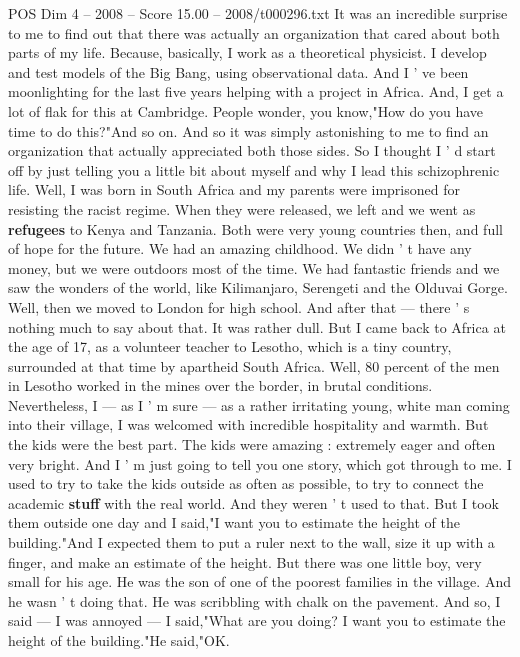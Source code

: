 \begin{textsample}{POS Dim 4 – 2008 – Score 15.00 – 2008/t000296.txt}  \label{ex:f4_pos_056}
It was an incredible surprise to me to find out that there was actually an organization that cared about both parts of my life.
Because, basically, I work as a theoretical physicist.
I develop and test models of the Big Bang, using observational data.
And I ' ve been moonlighting for the last five years helping with a project in Africa.
And, I get a lot of flak for this at Cambridge.
People wonder, you know,"How do you have time to do this?"And so on.
And so it was simply astonishing to me to find an organization that actually appreciated both those sides.
So I thought I ' d start off by just telling you a little bit about myself and why I lead this schizophrenic life.
Well, I was born in South Africa and my parents were imprisoned for resisting the racist regime.
When they were released, we left and we went as \textbf{refugees} to Kenya and Tanzania.
Both were very young countries then, and full of hope for the future.
We had an amazing childhood.
We didn ' t have any money, but we were outdoors most of the time.
We had fantastic friends and we saw the wonders of the world, like Kilimanjaro, Serengeti and the Olduvai Gorge.
Well, then we moved to London for high school.
And after that — there ' s nothing much to say about that.
It was rather dull.
But I came back to Africa at the age of 17, as a volunteer teacher to Lesotho, which is a tiny country, surrounded at that time by apartheid South Africa.
Well, 80 percent of the men in Lesotho worked in the mines over the border, in brutal conditions.
Nevertheless, I — as I ' m sure — as a rather irritating young, white man coming into their village, I was welcomed with incredible hospitality and warmth.
But the kids were the best part.
The kids were amazing : extremely eager and often very bright.
And I ' m just going to tell you one story, which got through to me.
I used to try to take the kids outside as often as possible, to try to connect the academic \textbf{stuff} with the real world.
And they weren ' t used to that.
But I took them outside one day and I said,"I want you to estimate the height of the building."And I expected them to put a ruler next to the wall, size it up with a finger, and make an estimate of the height.
But there was one little boy, very small for his age.
He was the son of one of the poorest families in the village.
And he wasn ' t doing that.
He was scribbling with chalk on the pavement.
And so, I said — I was annoyed — I said,"What are you doing?
I want you to estimate the height of the building."He said,"OK.

\end{textsample}

